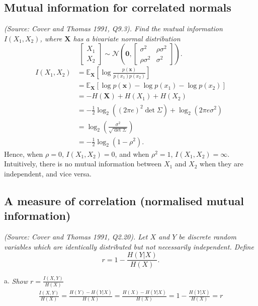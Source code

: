 \subsection{Mutual information for correlated normals}
\textit{(Source: Cover and Thomas 1991, Q9.3). Find the mutual information $I(X_1, X_2)$, where $\mathbf{X}$ has a bivariate normal distribution}
\begin{equation*}
\begin{bmatrix}X_1\\X_2\end{bmatrix} \sim \mathcal{N}\left(\mathbf{0}, \begin{bmatrix}\sigma^2&\rho\sigma^2\\\rho\sigma^2&\sigma^2\end{bmatrix}\right).
\end{equation*}
\begin{align*}
I(X_1, X_2) &= \mathbb{E}_{\mathbf{X}}\left[ \log\frac{p(\mathbf{x})}{p(x_1)p(x_2)} \right]\\
&= \mathbb{E}_{\mathbf{X}}[\log{p(\mathbf{x})} - \log{p(x_1)} - \log{p(x_2)}]\\
&= -H(\mathbf{X}) + H(X_1) + H(X_2)\\
&= -\frac{1}{2}\log_2\left((2\pi e)^2\det\Sigma\right) + \log_2\left(2\pi e\sigma^2\right)\\
&= \log_2\left(\frac{\sigma^2}{\sqrt{\det\Sigma}}\right)\\
&= -\frac{1}{2}\log_2(1-\rho^2).
\end{align*}
Hence, when $\rho = 0$, $I(X_1,X_2) = 0$, and when $\rho^2 = 1$, $I(X_1,X_2) = \infty$. Intuitively, there is no mutual information between $X_1$ and $X_2$ when they are independent, and vice versa.

\subsection{A measure of correlation (normalised mutual information)}
\textit{(Source: Cover and Thomas 1991, Q2.20). Let $X$ and $Y$ be discrete random variables which are identically distributed but not necessarily independent. Define}
\begin{equation*}
r = 1 - \frac{H(Y|X)}{H(X)}.
\end{equation*}

a. \textit{Show $r = \frac{I(X,Y)}{H(X)}$}
\begin{align*}
\frac{I(X,Y)}{H(X)} = \frac{H(Y) - H(Y|X)}{H(X)} = \frac{H(X) - H(Y|X)}{H(X)} = 1 - \frac{H(Y|X)}{H(X)} = r
\end{align*}

